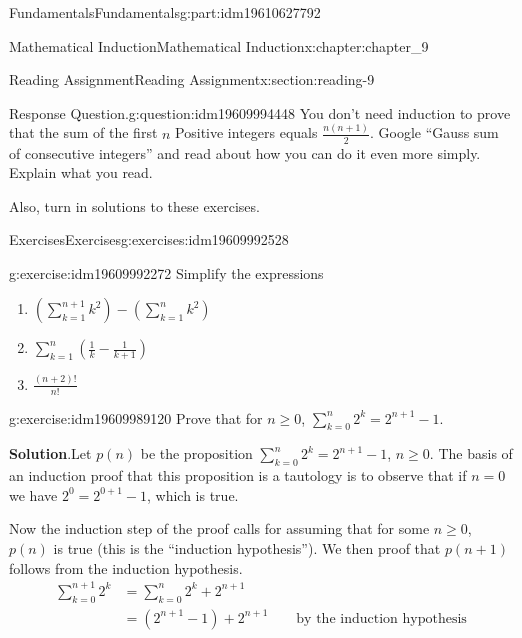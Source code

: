 \documentclass[oneside,10pt,]{book}
\newcommand{\blocktitlefont}{\relax}
\numberwithin{equation}{section}
\begin{document}
\begin{partptx}{Fundamentals}{}{Fundamentals}{}{}{g:part:idm19610627792}
\begin{chapterptx}{Mathematical Induction}{}{Mathematical Induction}{}{}{x:chapter:chapter_9}
\begin{sectionptx}{Reading Assignment}{}{Reading Assignment}{}{}{x:section:reading-9}
\begin{question}{Response Question.}{g:question:idm19609994448}%
You don’t need induction to prove that the sum of the first \(n\) Positive integers equals \(\frac{n(n+1)}{2}\). Google “Gauss sum of consecutive integers” and read about how you can do it even more simply. Explain what you read.%
\end{question}
Also, turn in solutions to these exercises.%
%
%
\typeout{************************************************}
\typeout{************************************************}
%
\begin{exercises-subsection-numberless}{Exercises}{}{Exercises}{}{}{g:exercises:idm19609992528}
\par\medskip\noindent%
%
\begin{exercisegroup}
\begin{divisionexerciseeg}{1}{}{}{g:exercise:idm19609992272}%
Simplify the expressions%
\begin{enumerate}[label=(\alph*)]
\item{}\(\displaystyle (\sum_{k=1}^{n+1}k^2) -(\sum_{k=1}^n k^2)\)%
\item{}\(\displaystyle \sum_{k=1}^n (\frac{1}{k}-\frac{1}{k+1})\)%
\item{}\(\displaystyle \frac{(n+2)!}{n!}\)%
\end{enumerate}
%
\end{divisionexerciseeg}%
\begin{divisionexerciseeg}{2}{}{}{g:exercise:idm19609989120}%
Prove that for \(n \ge 0\), \(\sum_{k=0}^n {2^k} = 2^{n+1}-1\).%
\par\smallskip%
\noindent\textbf{\blocktitlefont Solution}.\hypertarget{g:solution:idm19609987840}{}\quad{}Let \(p(n)\) be the proposition \(\sum_{k=0}^{n} 2^k = 2^{n+1}-1\), \(n\geq 0\).  The basis of an induction proof that this proposition is a tautology is to observe that if \(n=0\) we have \(2^0 = 2^{0+1}-1\), which is true.%
\par
Now the induction step of the proof calls for assuming that for some \(n \geq 0\), \(p(n)\) is true (this is the ``induction hypothesis'').   We then proof that \(p(n+1)\) follows from the induction hypothesis.%
\begin{equation*}
\begin{split}
\sum_{k=0}^{n+1} {2^k} &= \sum_{k=0}^n {2^k} +2^{n+1}\\
&= (2^{n+1}-1) + 2^{n+1} \quad\quad\textrm{by the induction hypothesis}\\

\end{split}
\end{equation*}
\end{divisionexerciseeg}
\end{exercisegroup}
\end{exercises-subsection-numberless}
\end{sectionptx}
\end{chapterptx}
\end{partptx}
\end{document}
